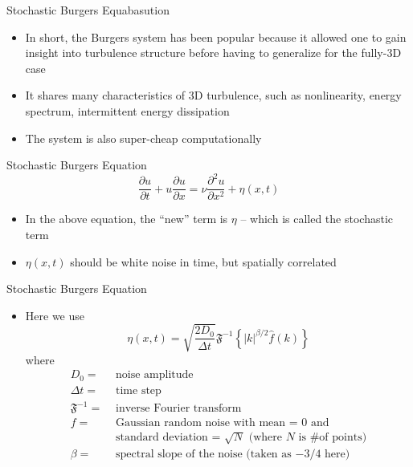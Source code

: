 \begin{frame}{Stochastic Burgers Equabasution}
\begin{itemize}
	\item In short, the Burgers system has been popular because it allowed one to gain insight into turbulence structure before having to generalize for the fully-3D case
	\item It shares many characteristics of 3D turbulence, such as nonlinearity, energy spectrum, intermittent energy dissipation
	\item The system is also super-cheap computationally
	\end{itemize}
\end{frame}

\begin{frame}{Stochastic Burgers Equation}
$$\frac{\partial u}{\partial t} + u\frac{\partial u}{\partial x} = \nu \frac{\partial^2 u}{\partial x^2} + \eta(x,t)$$
\begin{itemize}
	\item In the above equation, the ``new'' term is $\eta$ -- which is called the stochastic term
	\item $\eta(x,t)$ should be white noise in time, but spatially correlated
\end{itemize}

\end{frame}

\begin{frame}{Stochastic Burgers Equation}
\begin{itemize}
	\item Here we use
	$$\eta(x,t) = \sqrt{\frac{2D_0}{\Delta t}} \mathfrak{F}^{-1} \left\lbrace|k|^{\beta/2}\hat{f}(k)\right\rbrace$$
	where
	\begin{align*}
	D_0 =& \text{ noise amplitude}\\
	\Delta t = &\text{ time step}\\
	\mathfrak{F}^{-1} =& \text{ inverse Fourier transform}\\
	f =&\text{ Gaussian random noise with mean = 0 and}\\ 
	&\text{ standard deviation = $\sqrt{N}$ (where $N$ is \# of points)}\\
	\beta =& \text{ spectral slope of the noise (taken as $-3/4$ here)} 
	\end{align*}
\end{itemize}

\end{frame}

